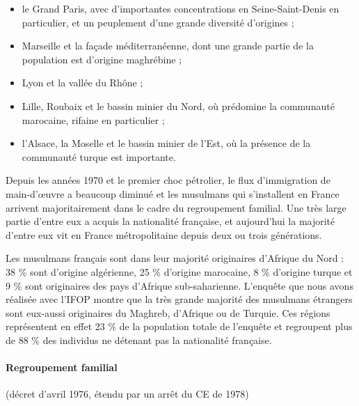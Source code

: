 \begin{itemize}
\item
  
  le Grand Paris, avec d'importantes concentrations en Seine-Saint-Denis
  en particulier, et un peuplement d'une grande diversité d'origines ;
  
\item
  
  Marseille et la façade méditerranéenne, dont une grande partie de la
  population est d'origine maghrébine ;
  
\item
  
  Lyon et la vallée du Rhône ;
  
\item
  
  Lille, Roubaix et le bassin minier du Nord, où prédomine la communauté
  marocaine, rifaine en particulier ;
  
\item
  
  l'Alsace, la Moselle et le bassin minier de l'Est, où la présence de
  la communauté turque est importante.
  
\end{itemize}


Depuis les années 1970  et le premier choc pétrolier, le flux
d'immigration de main-d'œuvre a beaucoup diminué et les musulmans qui
s'installent en France arrivent majoritairement dans le cadre du
regroupement familial. Une très large partie d'entre eux a acquis la
nationalité française, et aujourd'hui la majorité d'entre eux vit en
France métropolitaine depuis deux ou trois générations.

Les musulmans français sont dans leur majorité originaires d'Afrique du
Nord : 38 \% sont d'origine algérienne, 25 \% d'origine marocaine, 8 \%
d'origine turque et 9 \% sont originaires des pays d'Afrique
sub-saharienne. L'enquête que nous avons réalisée avec l'IFOP montre que
la très grande majorité des musulmans étrangers sont eux-aussi
originaires du Maghreb, d'Afrique ou de Turquie. Ces régions
représentent en effet 23 \% de la population totale de l'enquête et
regroupent plus de 88 \% des individus ne détenant pas la nationalité
française.


\paragraph{Regroupement familial}  (décret d’avril 1976, étendu par un arrêt du CE de 1978)

